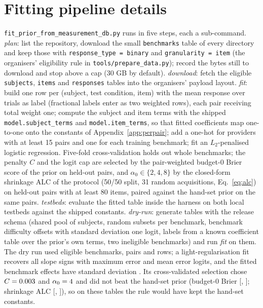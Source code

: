 \documentclass{article}
\begin{document}
\section{Fitting pipeline details}
\label{app:fit}

\texttt{fit\_prior\_from\_measurement\_db.py} runs in five steps, each a sub-command. \emph{plan}: list the repository, download the small \texttt{benchmarks} table of every directory and keep those with \texttt{response\_type = binary} and \texttt{granularity = item} (the organisers' eligibility rule in \texttt{tools/prepare\_data.py}); record the bytes still to download and stop above a cap (30 GB by default). \emph{download}: fetch the eligible \texttt{subjects}, \texttt{items} and \texttt{responses} tables into the organisers' payload layout. \emph{fit}: build one row per (subject, test condition, item) with the mean response over trials as label (fractional labels enter as two weighted rows), each pair receiving total weight one; compute the subject and item terms with the shipped \texttt{model.subject\_terms} and \texttt{model.item\_terms}, so that fitted coefficients map one-to-one onto the constants of Appendix~\ref{app:perpair}; add a one-hot for providers with at least 15 pairs and one for each training benchmark; fit an $L_2$-penalised logistic regression. Five-fold cross-validation holds out whole benchmarks; the penalty $C$ and the logit cap are selected by the pair-weighted budget-0 Brier score of the prior on held-out pairs, and $\alpha_0\in\{2,4,8\}$ by the closed-form shrinkage ALC of the protocol (50/50 split, 31 random acquisitions, Eq.~\ref{eq:alc}) on held-out pairs with at least 80 items, paired against the hand-set prior on the same pairs. \emph{testbeds}: evaluate the fitted table inside the harness on both local testbeds against the shipped constants. \emph{dry-run}: generate tables with the release schema (shared pool of subjects, random subsets per benchmark, benchmark difficulty offsets with standard deviation one logit, labels from a known coefficient table over the prior's own terms, two ineligible benchmarks) and run \emph{fit} on them. The dry run used \DryNBench{} eligible benchmarks, \DryNPairs{} pairs and \DryNRows{} rows; a light-regularisation fit recovers all \DryNSlopes{} slope signs with maximum error \DryMaxAbsErr{} and mean error \DryMeanAbsErr{} logits, and the fitted benchmark effects have standard deviation \DryBenchSd. Its cross-validated selection chose $C=0.003$ and $\alpha_0=4$ and did not beat the hand-set prior (budget-0 Brier \DryPairBZeroMean{} [\DryPairBZeroLo, \DryPairBZeroHi]; shrinkage ALC \DryPairAlcMean{} [\DryPairAlcLo, \DryPairAlcHi]), so on these tables the rule would have kept the hand-set constants.
\end{document}
